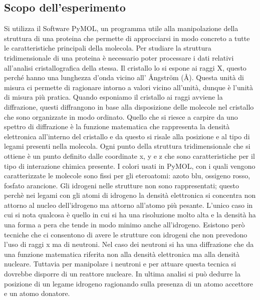 \documentclass[twocolumn,a4paper,10pt]{my_report}
\begin{document}
{{\subsection*{Scopo dell'esperimento}
Si utilizza il Software PyMOL, un programma utile alla manipolazione della struttura di una proteina che permette di approcciarsi in modo concreto a tutte le caratteristiche principali della molecola.
Per studiare la struttura tridimensionale di una proteina è necessario poter processare i dati relativi all'analisi cristallografica della stessa. Il cristallo lo si espone ai raggi X, questo perché hanno una lunghezza d’onda vicino all' Ångström (\si{\angstrom}).
Questa unità di misura ci permette di ragionare intorno a valori vicino all’unità, dunque è l’unità di misura più pratica. Quando esponiamo il cristallo ai raggi avviene la diffrazione, questi diffrangono in base alla disposizione delle molecole nel cristallo che sono organizzate in modo ordinato. Quello che si riesce a carpire da uno spettro di diffrazione è la funzione matematica che rappresenta la densità elettronica all’interno del cristallo e da questo si risale alla posizione e al tipo di legami presenti nella molecola.
Ogni punto della struttura tridimensionale che si ottiene è un punto definito dalle coordinate x, y e z che sono caratteristiche per il tipo di interazione chimica presente.
I colori usati in PyMOL, con i quali vengono caratterizzate le molecole sono fissi per gli eteroatomi: azoto blu, ossigeno rosso, fosfato arancione.
Gli idrogeni nelle strutture non sono rappresentati; questo perchè nei legami con gli atomi di idrogeno la densità elettronica si concentra non attorno al nucleo dell’idrogeno ma attorno all’atomo più pesante. L’unico caso in cui si nota qualcosa è quello in cui si ha una risoluzione molto alta e la densità ha una forma a pera che tende in modo minimo anche all’idrogeno. Esistono però tecniche che ci consentono di avere le strutture con idrogeni che non prevedono l'uso di raggi x ma di neutroni.
Nel caso dei neutroni si ha una diffrazione che da una funzione matematica riferita non alla densità elettronica ma alla densità nucleare. Tuttavia per manipolare i neutroni e per attuare questa tecnica si dovrebbe disporre di un reattore nucleare.
In ultima analisi si può dedurre la posizione di un legame idrogeno ragionando sulla presenza di un atomo accettore e un atomo donatore.

}}
\end{document}
